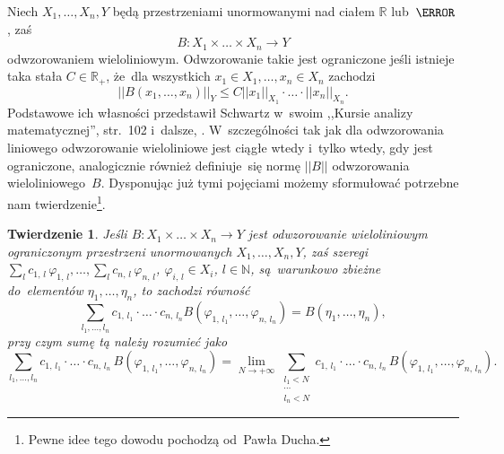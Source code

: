 \documentclass[a4paper,11pt]{article}
\newtheorem{twr}{Twierdzenie} %
\newcommand{\ld}{\ldots}
\newcommand{\ld}{\ldots}
\newcommand{\mb}{\mathbb}
\newcommand{\ra}{\rightarrow}
\newcommand{\wtw}{wtedy i~tylko wtedy}
\newcommand{\norm}[1]{\left|\left| #1 \right|\right|}
\newcommand{\vp}{\varphi}
\newcommand{\N}{\mb{N}}
\newcommand{\R}{\mb{R}}
\newcommand{\Rp}{\R_{ + }}
\newcommand{\ti}{\times}
\newcommand{\Lim}{\lim\limits}
\newcommand{\Sum}{\sum\limits}
\begin{document}
Niech $X_{ 1 }, \ld, X_{ n }, Y$ będą przestrzeniami unormowanymi nad
ciałem $\R$ lub~$\C$, zaś
\begin{equation*}
  B: X_{ 1 } \ti \ld \ti X_{ n } \ra Y
\end{equation*}
odwzorowaniem wieloliniowym. Odwzorowanie takie jest ograniczone jeśli
istnieje taka stała $C \in \Rp$, że~dla wszystkich
$x_{ 1 } \in X_{ 1 }, \ld, x_{ n } \in X_{ n }$ zachodzi
\begin{equation}
  \norm{ B( x_{ 1 }, \ld, x_{ n } ) }_{ Y } \leq C
  \norm{ x_{ 1 } }_{ X_{ 1 } } \cdot \ld \cdot \norm{ x_{ n } }_{ X_{ n } }.
\end{equation}
Podstawowe ich własności przedstawił Schwartz w~swoim ,,Kursie analizy
matematycznej'', str.~102 i~dalsze,
\cite{SchwartzKursAnalizyMatematycznej79}. W~szczególności tak jak dla
odwzorowania liniowego odwzorowanie wieloliniowe jest ciągłe \wtw, gdy
jest ograniczone, analogicznie również definiuje~się normę
$\norm{ B }$ odwzorowania wieloliniowego~$B$. Dysponując już tymi
pojęciami możemy sformułować potrzebne nam twierdzenie\footnote{Pewne
  idee tego dowodu pochodzą od~Pawła Ducha.}.

\begin{twr}
  \label{twr:OdwzorowanieWielolinioweCiagle}
  Jeśli $B: X_{ 1 } \ti \ld \ti X_{ n } \ra Y$ jest odwzorowanie
  wieloliniowym ograniczonym przestrzeni unormowanych
  $X_{ 1 }, \ld, X_{ n }, Y$, zaś szeregi
  $\sum_{ l } c_{ 1, \, l } \, \vp_{ 1, \, l }, \ld, \sum_{ l } c_{ n,
    \, l } \, \vp_{ n, \, l }$, $\vp_{ i, \, l } \in X_{ i }$,
  $l \in \N$, są~warunkowo zbieżne do~elementów
  $\eta_{ 1 }, \ld, \eta_{ n }$, to zachodzi równość
  \begin{equation*}
    \Sum_{ l_{ 1 }, \ld, l_{ n } } c_{ 1, \, l_{ 1 } } \cdot \ld \cdot
    c_{ n, \, l_{ n } } B( \vp_{ 1, \, l_{ 1 } }, \ld,
    \vp_{ n, \, l_{ n } } ) = B( \eta_{ 1 }, \ld, \eta_{ n } ),
  \end{equation*}
  przy czym sumę tą należy rozumieć jako
  \begin{equation*}
    \Sum_{ l_{ 1 }, \ld, l_{ n } } c_{ 1, \, l_{ 1 } } \cdot \ld \cdot
    c_{ n, \, l_{ n } } \, B( \vp_{ 1, \, l_{ 1 } }, \ld,
    \vp_{ n, \, l_{ n } } ) = \Lim_{ N \ra +\infty }
    \Sum_{ \substack{ l_{ 1 } < N \\ \cdots \\ l_{ n } < N } }
    c_{ 1, \, l_{ 1 } } \cdot \ld \cdot c_{ n, \, l_{ n } } \,
    B( \vp_{ 1, \, l_{ 1 } }, \ld, \vp_{ n, \, l_{ n } } ).
  \end{equation*}
\end{twr}
\end{document}
